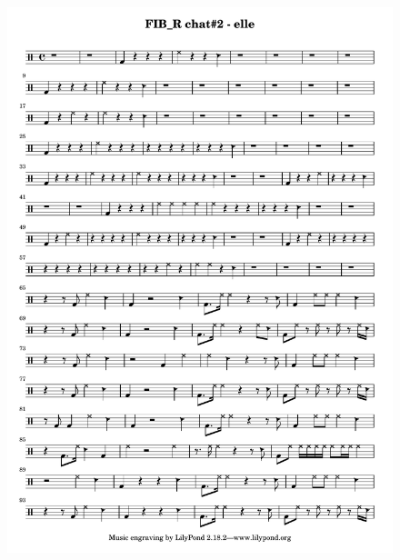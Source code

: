 

\begin{figure}[!htbp]
	\captionsetup{format=plain}%
	\centering
	\begin{minipage}[t]{0.48\textwidth}
		\includegraphics[width=\linewidth]{gfx/notation/FIBR-Chat2-Elle.pdf}

\end{minipage}
\end{figure}
